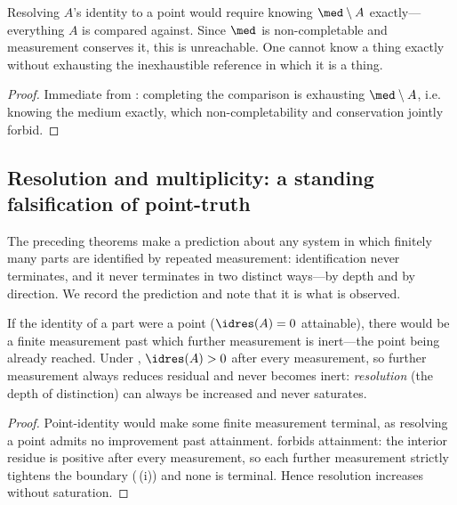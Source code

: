 \begin{corollary}
\label{cor:know-whole}
Resolving $A$'s identity to a point would require knowing $\med\setminus A$
exactly---everything $A$ is compared against. Since $\med$ is non-completable and
measurement conserves it, this is unreachable. One cannot know a thing exactly
without exhausting the inexhaustible reference in which it is a thing.
\end{corollary}

\begin{proof}
Immediate from : completing the comparison is exhausting
$\med\setminus A$, i.e. knowing the medium exactly, which non-completability and
conservation jointly forbid.
\end{proof}

\subsection{Resolution and multiplicity: a standing falsification of point-truth}

The preceding theorems make a prediction about any system in which finitely many
parts are identified by repeated measurement: identification never terminates, and
it never terminates in two distinct ways---by depth and by direction. We record
the prediction and note that it is what is observed.

\begin{proposition}
\label{prop:resolution}
If the identity of a part were a point \textup{(}$\idres(A)=0$ attainable\textup{)},
there would be a finite measurement past which further measurement is inert---the
point being already reached. Under , $\idres(A)>0$ after
every measurement, so further measurement always reduces residual and never
becomes inert: \emph{resolution} \textup{(}the depth of distinction\textup{)} can
always be increased and never saturates.
\end{proposition}

\begin{proof}
Point-identity would make some finite measurement terminal, as resolving a point
admits no improvement past attainment.  forbids attainment:
the interior residue is positive after every measurement, so each further
measurement strictly tightens the boundary (\,(i)) and
none is terminal. Hence resolution increases without saturation.
\end{proof}

